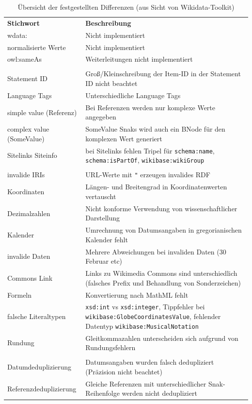 \begin{table}
  \begin{tabular}{lp{}}
    \bfseries{Stichwort} & \bfseries{Beschreibung} \\
    wdata: & Nicht implementiert \\
    normalisierte Werte & Nicht implementiert \\
    owl:sameAs & Weiterleitungen nicht implementiert \\
    \\
    Statement ID & Groß/Kleinschreibung der Item-ID in der Statement ID nicht beachtet \\
    Language Tags & Unterschiedliche Language Tags \\
    simple value (Referenz) & Bei Referenzen werden nur komplexe Werte angegeben \\
    complex value (SomeValue) & SomeValue Snaks wird auch ein BNode für den komplexen Wert generiert \\
    Sitelinks Siteinfo & bei Sitelinks fehlen Tripel für \verb|schema:name|, \verb|schema:isPartOf|, \verb|wikibase:wikiGroup| \\
    \\
    invalide IRIs & URL-Werte mit \verb|"| erzeugen invalides RDF \\
    Koordinaten & Längen- und Breitengrad in Koordinatenwerten vertauscht \\
    Dezimalzahlen & Nicht konforme Verwendung von wissenschaftlicher Darstellung \\
    Kalender & Umrechnung von Datumsangaben in gregorianischen Kalender fehlt \\
    invalide Daten & Mehrere Abweichungen bei invaliden Daten (30 Februar etc) \\
    Commons Link & Links zu Wikimedia Commons sind unterschiedlich (falsches Prefix und Behandlung von Sonderzeichen) \\
    Formeln & Konvertierung nach MathML fehlt \\
    falsche Literaltypen & \verb|xsd:int| vs \verb|xsd:integer|, Tippfehler bei \verb|wikibase:GlobeCoordinatesValue|, fehlender Datentyp \verb|wikibase:MusicalNotation| \\
    Rundung & Gleitkommazahlen unterscheiden sich aufgrund von Rundungsfehlern \\
    \\
    Datumdeduplizierung & Datumsangaben wurden falsch dedupliziert (Präzision nicht beachtet) \\
    Referenzdeduplizierung & Gleiche Referenzen mit unterschiedlicher Snak-Reihenfolge werden nicht dedupliziert \\
  \end{tabular}
  \caption{Übersicht der festgestellten Differenzen (aus Sicht von Wikidata-Toolkit)}
  \label{tab:wdtk-diff}
\end{table}

